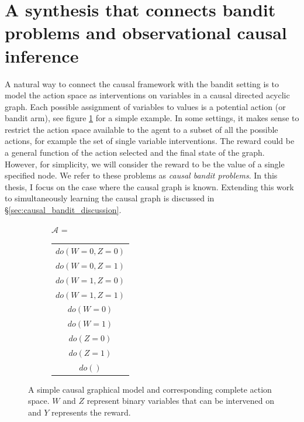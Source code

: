 \documentclass[11pt,a4paper,twoside]{report}
\newcommand{\actionspace}{\mathcal{A}}
\theoremstyle{plain}
\theoremstyle{definition}
\begin{document}
\section{A synthesis that connects bandit problems and observational causal inference}
\label{sec:intro_causal_bandit}
A natural way to connect the causal framework with the bandit setting is to model the action space as interventions on variables in a causal directed acyclic graph. Each possible assignment of variables to values is a potential action (or bandit arm), see figure \ref{fig:unify_frameworks} for a simple example. In some settings, it makes sense to restrict the action space available to the agent to a subset of all the possible actions, for example the set of single variable interventions. The reward could be a general function of the action selected and the final state of the graph. However, for simplicity, we will consider the reward to be the value of a single specified node. We refer to these problems as \emph{causal bandit problems}. In this thesis, I focus on the case where the causal graph is known. Extending this work to simultaneously learning the causal graph is discussed in \S\ref{sec:causal_bandit_discussion}.

\begin{figure}
\centering
\begin{subfigure}[c]{0.3\textwidth}
\end{subfigure}
\begin{subfigure}[t]{0.4\textwidth}
$\actionspace$ = \begin{tabular}{|c|}
	\hline
  $do(W=0,Z=0)$ \\
  $do(W=0,Z=1)$ \\
  $do(W=1,Z=0)$ \\
  $do(W=1,Z=1)$ \\
  \hline
  $do(W=0)$ \\
  $do(W=1)$ \\
  $do(Z=0)$ \\
  $do(Z=1)$ \\
  $do()$ \\
  \hline
\end{tabular}
\end{subfigure}
\caption{A simple causal graphical model and corresponding complete action space. $W$ and $Z$ represent binary variables that can be intervened on and $Y$ represents the reward.}
\label{fig:unify_frameworks}
\end{figure} 
\end{document}
